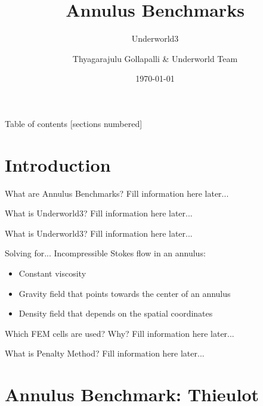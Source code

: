 \documentclass[10pt,aspectratio=169]{beamer}
\title{Annulus Benchmarks}
\subtitle{Underworld3}
\date{\today}
\author{Thyagarajulu Gollapalli \& Underworld Team}
\institute{Monash University}
\begin{document}
\maketitle

\begin{frame}{Table of contents}
  [sections numbered]
  \tableofcontents[hideallsubsections]
\end{frame}

\section{Introduction}

\begin{frame}[fragile]{What are Annulus Benchmarks?}
	Fill information here later...
\end{frame}

\begin{frame}[fragile]{What is Underworld3?}
	Fill information here later...
\end{frame}

\begin{frame}[fragile]{What is Underworld3?}
	Fill information here later...
\end{frame}

\begin{frame}[fragile]{Solving for...}
	Incompressible Stokes flow in an annulus:
	\begin{itemize}
		\item Constant viscosity
		\item Gravity field that points towards the center of an annulus
		\item Density field that depends on the spatial coordinates
	\end{itemize}
\end{frame}

\begin{frame}[fragile]{Which FEM cells are used? Why?}
	Fill information here later...
\end{frame}

\begin{frame}[fragile]{What is Penalty Method?}
	Fill information here later...
\end{frame}

\section{Annulus Benchmark: Thieulot}
\end{document}
